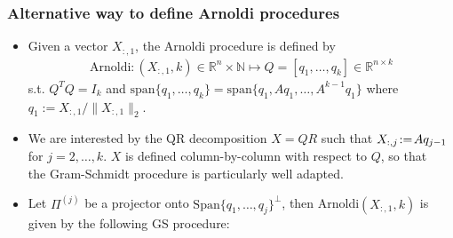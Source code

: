 \documentclass[t,usepdftitle=false]{beamer}
\begin{document}
\begin{frame}
\frametitle{Alternative way to define Arnoldi procedures}	
\begin{itemize}
\item Given a vector $X_{:,1}$, the Arnoldi procedure is defined by 
\begin{align*}
\mathrm{Arnoldi}:
(X_{:,1},k)\in\mathbb{R}^{n}\times\mathbb{N}
\mapsto
Q=[q_1,\dots,q_k]\in\mathbb{R}^{n\times k}
\end{align*}
s.t. $Q^TQ=I_k$ and $\mathrm{span}\{q_1,\dots,q_k\}=\mathrm{span}\{q_1,Aq_1,\dots,A^{k-1}q_1\}$ where $q_1:=X_{:,1}/\|X_{:,1}\|_2$.\vspace{.1cm}
\item $\!\!$We are interested by the QR decomposition $X\!\!=\!QR$ such that $X_{:,j}\!:=\!Aq_{j-1}\hspace{-1cm}$\\
$\!\!$for $j=2,\dots,k$.
$X$ is defined column-by-column with respect to $Q$, so that\\
$\!\!$the Gram-Schmidt procedure is particularly well adapted.\vspace{.1cm}
\item Let $\Pi^{(j)}$ be a projector onto $\mathrm{Span}\{q_1,\dots,q_j\}^\perp$, then Arnoldi$(X_{:,1},k)$ is given by the following GS procedure:
\begin{algorithm}[H]
\small
\caption{$\mathrm{Arnoldi}:(X_{:,1},k)\mapsto Q$}
\begin{algorithmic}[1]
\ENDFOR
\end{algorithmic}
\end{algorithm}		
\end{itemize}
\end{frame}   
\end{document}
